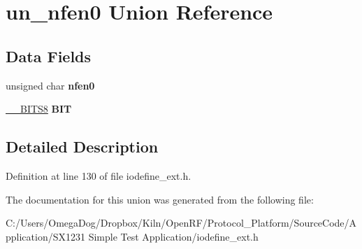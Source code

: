 \hypertarget{unionun__nfen0}{\section{un\-\_\-nfen0 Union Reference}
\label{unionun__nfen0}
}
\subsection*{Data Fields}
\begin{DoxyCompactItemize}
\item 
\hypertarget{unionun__nfen0_a1a136477168c91e243ce09c7655824fc}{unsigned char {\bfseries nfen0}}\label{unionun__nfen0_a1a136477168c91e243ce09c7655824fc}

\item 
\hypertarget{unionun__nfen0_ad5ed84da69372a75274b711eef841ac9}{\hyperlink{struct_____b_i_t_s8}{\-\_\-\-\_\-\-B\-I\-T\-S8} {\bfseries B\-I\-T}}\label{unionun__nfen0_ad5ed84da69372a75274b711eef841ac9}

\end{DoxyCompactItemize}


\subsection{Detailed Description}


Definition at line 130 of file iodefine\-\_\-ext.\-h.



The documentation for this union was generated from the following file\-:\begin{DoxyCompactItemize}
\item 
C\-:/\-Users/\-Omega\-Dog/\-Dropbox/\-Kiln/\-Open\-R\-F/\-Protocol\-\_\-\-Platform/\-Source\-Code/\-Application/\-S\-X1231 Simple Test Application/iodefine\-\_\-ext.\-h\end{DoxyCompactItemize}
